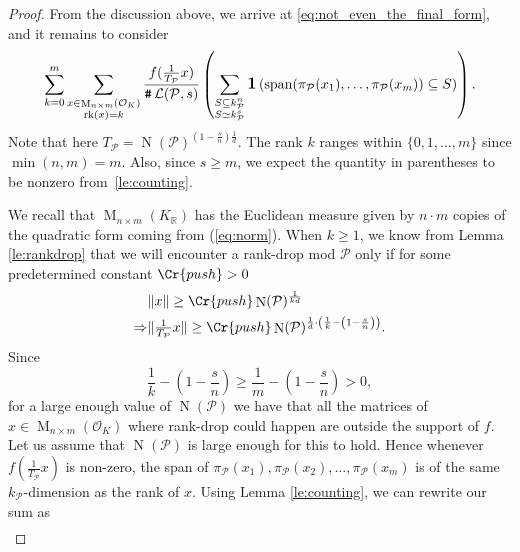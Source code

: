 \documentclass{amsart}
\theoremstyle{definition}
\theoremstyle{remark}
\DeclareMathOperator{\M}{M}
\DeclareMathOperator{\card}{\texttt{\#}}
\DeclareMathOperator{\rank}{rk}
\DeclareMathOperator{\spant}{span}
\DeclareMathOperator{\ind}{\mathlarger{\mathbf{1}}}
\DeclareMathOperator{\N}{N}
\begin{document}
\begin{proof}
    From the discussion above, we arrive at \cref{eq:not_even_the_final_form}, and it remains to consider
    \begin{align}
        \sum_{k=0}^{m}\sum_{\substack{x \in \M_{n \times m }(\mathcal{O}_K) \\ \rank(x) = k}}
        \frac{  f( \tfrac{1}{T_{\mathcal{P}}} x)}{\card \mathcal{L}(\mathcal{P},s)} 
        \left(
            \sum_{\substack{  S \subseteq k_\mathcal{P}^{n} \\  S \simeq k_{\mathcal{P}}^{s} } } 
            \ind\left(
                \spant
                ( \pi_{\mathcal{P}}(x_1),\dots,\pi_{\mathcal{P}}(x_m)) \subseteq S
        \right) \right).
    \end{align}
    Note that here $T_{\mathcal{P}} =  \N(\mathcal{P})^{\left(1-\frac{s}{n}\right)\frac{1}{d}}$. The rank $k$ ranges within $\{0,1,\dots,m\}$ since $\min(n,m)=m$. Also, since $s \ge m$, we expect the quantity in parentheses to be nonzero from~\cref{le:counting}.\par
    We recall that $\M_{n \times m }(K_{\mathbb{R}})$ has the Euclidean measure given by $n \cdot  m$ copies of the quadratic form coming from (\ref{eq:norm}).
    When $k\geq 1$, we know from Lemma \ref{le:rankdrop} that we will encounter a rank-drop mod $\mathcal{P}$ only if for some predetermined constant $\Cr{push}>0$
    \begin{align}
& \| x \|  \ge \Cr{push} \N(\mathcal{P})^{\frac{1}{kd}}  \\
        \Rightarrow &  \|\tfrac{1}{T_{\mathcal{P}}} x\| \ge \Cr{push} \N(\mathcal{P})^{\frac{1}{d} \cdot \left( \frac{1}{k} - \left(1 - \frac{s}{n}\right)\right)}.
    \end{align}
    Since 
    \begin{equation}
        \frac{1}{k} - \left(1-\frac{s}{n} \right) \ge  \frac{1}{m} - \left(1- \frac{s}{n}\right) > 0,
    \end{equation}
    for a large enough value of $\N(\mathcal{P})$ we have that all the matrices of 
    $x \in \M_{n  \times m }\left(\mathcal{O}_K\right)$ where rank-drop could happen are outside the support of $f$. 
    Let us assume that $\N(\mathcal{P})$ is large enough for this to hold. 
    Hence whenever $f(\tfrac{1}{T_{\mathcal{P}}} x)$ is non-zero, the span of $ \pi_\mathcal{P}(x_1) , \pi_\mathcal{P}(x_2) ,\dots,  \pi_\mathcal{P}(x_m) $ is of the same $k_\mathcal{P}$-dimension as the rank of $x$. 
    Using Lemma \ref{le:counting}, we can rewrite our sum as
    {\small\begin{align}

\end{align}}
\end{proof}
\end{document}
